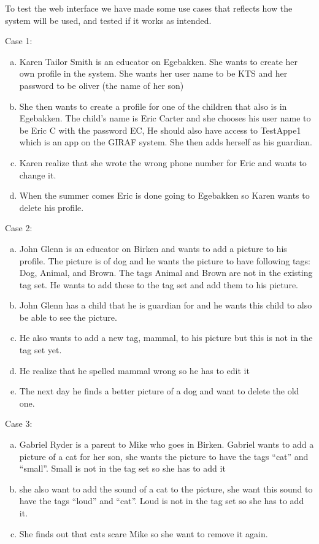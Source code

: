To test the web interface we have made some use cases that reflects how the system will be used, and tested if it works as intended. 

Case 1:
\begin{enumerate}[(a)]
\item Karen Tailor Smith is an educator on Egebakken. She wants to create her own profile in the system. She wants her user name to be KTS and her password to be oliver (the name of her son)

\item She then wants to create a profile for one of the children that also is in Egebakken. The child's name is Eric Carter and she chooses his user name to be Eric C with the password EC, He should also have access to TestAppe1 which is an app on the GIRAF system. She then adds herself as his guardian.

\item Karen realize that she wrote the wrong phone number for Eric and wants to change it.

\item When the summer comes Eric is done going to Egebakken so Karen wants to delete his profile. 
\end{enumerate}
Case 2:
\begin{enumerate}[(a)]
\item John Glenn is an educator on Birken and wants to add a picture to his profile. The picture is of dog and he wants the picture to have following tags: Dog, Animal, and Brown. The tags Animal and Brown are not in the existing tag set. He wants to add these to the tag set and add them to his picture.

\item John Glenn has a child that he is guardian for and he wants this child to also be able to see the picture.

\item He also wants to add a new tag, mammal, to his picture but this is not in the tag set yet. 

\item He realize that he spelled mammal wrong so he has to edit it

\item The next day he finds a better picture of a dog and want to delete the old one.
\end{enumerate}
Case 3:
\begin{enumerate}[(a)]
\item Gabriel Ryder is a parent to Mike who goes in Birken. Gabriel wants to add a picture of a cat for her son, she wants the picture to have the tags ``cat'' and ``small''. Small is not in the tag set so she has to add it

\item she also want to add the sound of a cat to the picture, she want this sound to have the tags ``loud'' and ``cat''. Loud is not in the tag set so she has to add it.

\item She finds out that cats scare Mike so she want to remove it again.
\end{enumerate}

